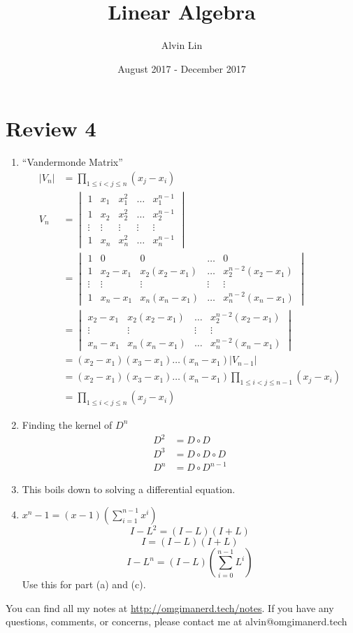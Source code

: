 \documentclass{math}
\title{Linear Algebra}
\author{Alvin Lin}
\date{August 2017 - December 2017}
\begin{document}
\maketitle

\section*{Review 4}
\begin{enumerate}
  \item ``Vandermonde Matrix''
  \begin{align*}
    |V_n| &= \prod_{1\le i<j\le n}(x_j-x_i) \\
    V_n &= \begin{vmatrix}
      1 & x_1 & x_1^2 & \dots & x_1^{n-1} \\
      1 & x_2 & x_2^2 & \dots & x_2^{n-1} \\
      \vdots & \vdots & \vdots & \vdots & \vdots \\
      1 & x_n & x_n^2 & \dots & x_n^{n-1}
    \end{vmatrix} \\
    &= \begin{vmatrix}
      1 & 0 & 0 & \dots & 0 \\
      1 & x_2-x_1 & x_2(x_2-x_1) & \dots & x_2^{n-2}(x_2-x_1) \\
      \vdots & \vdots & \vdots & \vdots & \vdots \\
      1 & x_n-x_1 & x_n(x_n-x_1) & \dots & x_n^{n-2}(x_n-x_1)
    \end{vmatrix} \\
    &= \begin{vmatrix}
      x_2-x_1 & x_2(x_2-x_1) & \dots & x_2^{n-2}(x_2-x_1) \\
      \vdots & \vdots & \vdots & \vdots \\
      x_n-x_1 & x_n(x_n-x_1) & \dots & x_n^{n-2}(x_n-x_1)
    \end{vmatrix} \\
    &= (x_2-x_1)(x_3-x_1)\dots(x_n-x_1)|V_{n-1}| \\
    &= (x_2-x_1)(x_3-x_1)\dots(x_n-x_1)\prod_{1\le i<j\le n-1}(x_j-x_i) \\
    &= \prod_{1\le i<j\le n}(x_j-x_i)
  \end{align*}
  \item Finding the kernel of \( D^n \)
  \begin{align*}
    D^2 &= D\circ D \\
    D^3 &= D\circ D\circ D \\
    D^n &= D\circ D^{n-1}
  \end{align*}
  \item This boils down to solving a differential equation.
  \item \( x^n-1 = (x-1)(\sum_{i=1}^{n-1}x^i) \)
  \[ I-L^2 = (I-L)(I+L) \]
  \[ I = (I-L)(I+L) \]
  \[ I-L^n = (I-L)\left(\sum_{i=0}^{n-1}L^i\right) \]
  Use this for part (a) and (c).
\end{enumerate}

\begin{center}
  You can find all my notes at \url{http://omgimanerd.tech/notes}. If you have
  any questions, comments, or concerns, please contact me at
  alvin@omgimanerd.tech
\end{center}
\end{document}
